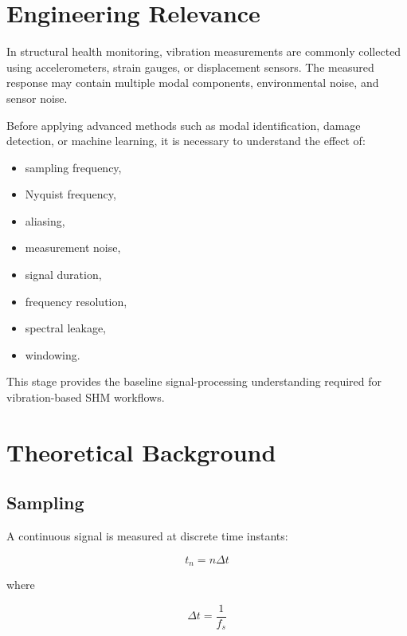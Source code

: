 \documentclass[11pt,a4paper]{article}
\begin{document}
\section{Engineering Relevance}

In structural health monitoring, vibration measurements are commonly collected using accelerometers, strain gauges, or displacement sensors. The measured response may contain multiple modal components, environmental noise, and sensor noise.

Before applying advanced methods such as modal identification, damage detection, or machine learning, it is necessary to understand the effect of:

\begin{itemize}
    \item sampling frequency,
    \item Nyquist frequency,
    \item aliasing,
    \item measurement noise,
    \item signal duration,
    \item frequency resolution,
    \item spectral leakage,
    \item windowing.
\end{itemize}

This stage provides the baseline signal-processing understanding required for vibration-based SHM workflows.

\section{Theoretical Background}

\subsection{Sampling}

A continuous signal is measured at discrete time instants:

\begin{equation}
t_n = n\Delta t
\end{equation}

where

\begin{equation}
\Delta t = \frac{1}{f_s}
\end{equation}
\end{document}
